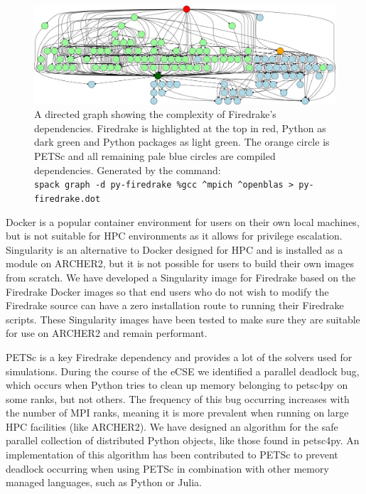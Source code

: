 \documentclass[a4paper,11pt]{article}
\begin{document}
\begin{figure}[htp]
	\centering
	\includegraphics[width=\textwidth]{firedrake_deps.png}
	\caption{A directed graph showing the complexity of Firedrake's dependencies. Firedrake is highlighted at the top in red, Python as dark green and Python packages as light green. The orange circle is PETSc and all remaining pale blue circles are compiled dependencies. Generated by the command:\\ \texttt{spack graph -d py-firedrake \%gcc \^{}mpich \^{}openblas \textgreater{} py-firedrake.dot}}
	\label{fig:fddeps}
\end{figure}

Docker is a popular container environment for users on their own local machines, but is not suitable for HPC environments as it allows for privilege escalation.
Singularity is an alternative to Docker designed for HPC and is installed as a module on ARCHER2, but it is not possible for users to build their own images from scratch.
We have developed a Singularity image for Firedrake based on the Firedrake Docker images so that end users who do not wish to modify the Firedrake source can have a zero installation route to running their Firedrake scripts.
These Singularity images have been tested to make sure they are suitable for use on ARCHER2 and remain performant.

PETSc is a key Firedrake dependency and provides a lot of the solvers used for simulations.
During the course of the eCSE we identified a parallel deadlock bug, which occurs when Python tries to clean up memory belonging to petsc4py on some ranks, but not others.
The frequency of this bug occurring increases with the number of MPI ranks, meaning it is more prevalent when running on large HPC facilities (like ARCHER2).
We have designed an algorithm for the safe parallel collection of distributed Python objects, like those found in petsc4py.
An implementation of this algorithm has been contributed to PETSc to prevent deadlock occurring when using PETSc in combination with other memory managed languages, such as Python or Julia.
\end{document}
